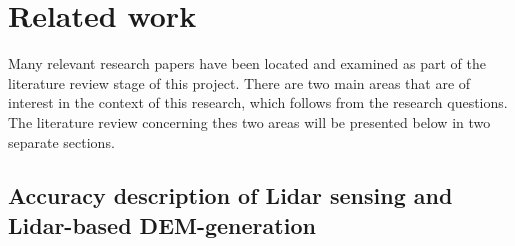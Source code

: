 
\chapter{Related work}
\label{chap:rw}

Many relevant research papers have been located and examined as part of the literature review stage of this project. There are two main areas that are of interest in the context of this research, which follows from the research questions. The literature review concerning thes two areas will be presented below in two separate sections.

\section*{Accuracy description of Lidar sensing and Lidar-based DEM-generation}

